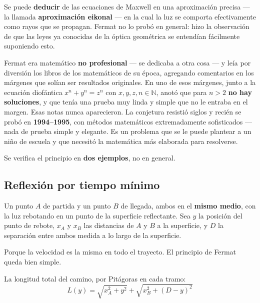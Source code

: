 \documentclass[12pt,a4paper]{article}
\begin{document}
\begin{notebox}
Se puede \textbf{deducir} de las ecuaciones de Maxwell en una aproximación
precisa --- la llamada \textbf{aproximación eikonal} --- en la cual la luz se
comporta efectivamente como rayos que se propagan. Fermat no lo probó en general:
hizo la observación de que las leyes ya conocidas de la óptica geométrica se
entendían fácilmente suponiendo esto.
\end{notebox}

\begin{notebox}[Anécdota]
Fermat era matemático \textbf{no profesional} --- se dedicaba a otra cosa --- y
leía por diversión los libros de los matemáticos de su época, agregando
comentarios en los márgenes que solían ser resultados originales. En uno de esos
márgenes, junto a la ecuación diofántica $x^n + y^n = z^n$ con
$x,y,z,n \in \mathbb{N}$, anotó que para $n > 2$ \textbf{no hay soluciones}, y que
tenía una prueba muy linda y simple que no le entraba en el margen. Esas notas
nunca aparecieron. La conjetura resistió siglos y recién se probó en
\textbf{1994--1995}, con métodos matemáticos extremadamente sofisticados --- nada
de prueba simple y elegante. Es un problema que se le puede plantear a un niño de
escuela y que necesitó la matemática más elaborada para resolverse.
\end{notebox}

Se verifica el principio en \textbf{dos ejemplos}, no en general.

\subsection{Reflexión por tiempo mínimo}

Un punto $A$ de partida y un punto $B$ de llegada, ambos en el \textbf{mismo
medio}, con la luz rebotando en un punto de la superficie reflectante. Sea $y$ la
posición del punto de rebote, $x_A$ y $x_B$ las distancias de $A$ y $B$ a la
superficie, y $D$ la separación entre ambos medida a lo largo de la superficie.

\begin{notebox}[En un único medio, tiempo mínimo $=$ distancia mínima]
Porque la velocidad es la misma en todo el trayecto. El principio de Fermat queda
bien simple.
\end{notebox}

La longitud total del camino, por Pitágoras en cada tramo:
\[
L(y) = \sqrt{x_A^2 + y^2} + \sqrt{x_B^2 + (D-y)^2}
\]
\end{document}
